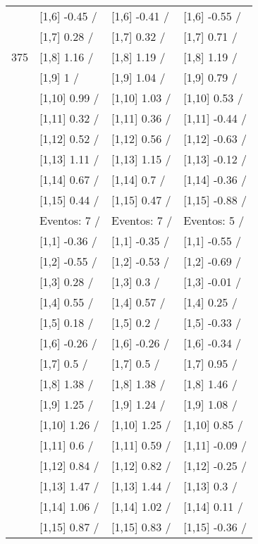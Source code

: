 \begin{table}
\begin{tabular}[t]{llll}
 & {}[1,6] -0.45  / & {}[1,6] -0.41  / & {}[1,6] -0.55  /\\
 & {}[1,7] 0.28  / & {}[1,7] 0.32  / & {}[1,7] 0.71  /\\
375 & {}[1,8] 1.16  / & {}[1,8] 1.19  / & {}[1,8] 1.19  /\\
\addlinespace
 & {}[1,9] 1  / & {}[1,9] 1.04  / & {}[1,9] 0.79  /\\
 & {}[1,10] 0.99  / & {}[1,10] 1.03  / & {}[1,10] 0.53  /\\
 & {}[1,11] 0.32  / & {}[1,11] 0.36  / & {}[1,11] -0.44  /\\
 & {}[1,12] 0.52  / & {}[1,12] 0.56  / & {}[1,12] -0.63  /\\
 & {}[1,13] 1.11  / & {}[1,13] 1.15  / & {}[1,13] -0.12  /\\
\addlinespace
 & {}[1,14] 0.67  / & {}[1,14] 0.7  / & {}[1,14] -0.36  /\\
 & {}[1,15] 0.44  / & {}[1,15] 0.47  / & {}[1,15] -0.88  /\\
 & Eventos:  7 / & Eventos:  7 / & Eventos:  5 /\\
 & {}[1,1] -0.36  / & {}[1,1] -0.35  / & {}[1,1] -0.55  /\\
 & {}[1,2] -0.55  / & {}[1,2] -0.53  / & {}[1,2] -0.69  /\\
\addlinespace
 & {}[1,3] 0.28  / & {}[1,3] 0.3  / & {}[1,3] -0.01  /\\
 & {}[1,4] 0.55  / & {}[1,4] 0.57  / & {}[1,4] 0.25  /\\
 & {}[1,5] 0.18  / & {}[1,5] 0.2  / & {}[1,5] -0.33  /\\
 & {}[1,6] -0.26  / & {}[1,6] -0.26  / & {}[1,6] -0.34  /\\
 & {}[1,7] 0.5  / & {}[1,7] 0.5  / & {}[1,7] 0.95  /\\
\addlinespace
500 & {}[1,8] 1.38  / & {}[1,8] 1.38  / & {}[1,8] 1.46  /\\
 & {}[1,9] 1.25  / & {}[1,9] 1.24  / & {}[1,9] 1.08  /\\
 & {}[1,10] 1.26  / & {}[1,10] 1.25  / & {}[1,10] 0.85  /\\
 & {}[1,11] 0.6  / & {}[1,11] 0.59  / & {}[1,11] -0.09  /\\
 & {}[1,12] 0.84  / & {}[1,12] 0.82  / & {}[1,12] -0.25  /\\
\addlinespace
 & {}[1,13] 1.47  / & {}[1,13] 1.44  / & {}[1,13] 0.3  /\\
 & {}[1,14] 1.06  / & {}[1,14] 1.02  / & {}[1,14] 0.11  /\\
 & {}[1,15] 0.87  / & {}[1,15] 0.83  / & {}[1,15] -0.36  /\\
\bottomrule
\end{tabular}
\end{table}
